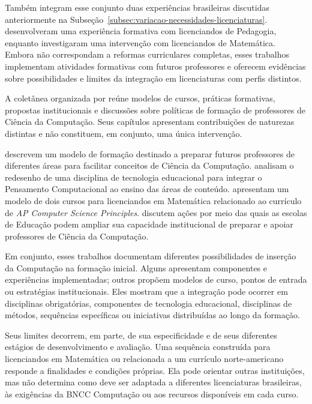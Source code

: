 Também integram esse conjunto duas experiências brasileiras discutidas anteriormente na Subseção~\ref{subsec:variacao-necessidades-licenciaturas}.  desenvolveram uma experiência formativa com licenciandos de Pedagogia, enquanto  investigaram uma intervenção com licenciandos de Matemática. Embora não correspondam a reformas curriculares completas, esses trabalhos implementam atividades formativas com futuros professores e oferecem evidências sobre possibilidades e limites da integração em licenciaturas com perfis distintos.

A coletânea organizada por  reúne modelos de cursos, práticas formativas, propostas institucionais e discussões sobre políticas de formação de professores de Ciência da Computação. Seus capítulos apresentam contribuições de naturezas distintas e não constituem, em conjunto, uma única intervenção.

 descrevem um modelo de formação destinado a preparar futuros professores de diferentes áreas para facilitar conceitos de Ciência da Computação.  analisam o redesenho de uma disciplina de tecnologia educacional para integrar o Pensamento Computacional ao ensino das áreas de conteúdo.  apresentam um modelo de dois cursos para licenciandos em Matemática relacionado ao currículo de \textit{AP Computer Science Principles}.  discutem ações por meio das quais as escolas de Educação podem ampliar sua capacidade institucional de preparar e apoiar professores de Ciência da Computação.

Em conjunto, esses trabalhos documentam diferentes possibilidades de inserção da Computação na formação inicial. Alguns apresentam componentes e experiências implementadas; outros propõem modelos de curso, pontos de entrada ou estratégias institucionais. Eles mostram que a integração pode ocorrer em disciplinas obrigatórias, componentes de tecnologia educacional, disciplinas de métodos, sequências específicas ou iniciativas distribuídas ao longo da formação.

Seus limites decorrem, em parte, de sua especificidade e de seus diferentes estágios de desenvolvimento e avaliação. Uma sequência construída para licenciandos em Matemática ou relacionada a um currículo norte-americano responde a finalidades e condições próprias. Ela pode orientar outras instituições, mas não determina como deve ser adaptada a diferentes licenciaturas brasileiras, às exigências da BNCC Computação ou aos recursos disponíveis em cada curso.

